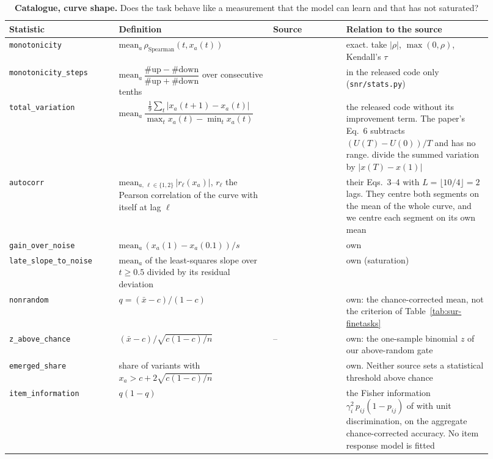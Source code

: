 \begin{table}[t]
\centering
\scriptsize
\begin{tabular}{@{}p{0.215\linewidth}p{0.28\linewidth}p{0.14\linewidth}p{0.285\linewidth}@{}}
\toprule
\textbf{Statistic} & \textbf{Definition} & \textbf{Source} & \textbf{Relation to the source} \\
\midrule
\texttt{monotonicity} & $\mathrm{mean}_a\,\rho_{\text{Spearman}}(t, x_a(t))$ & \citet{kydlicek_finetasks_nodate} & exact. \citet{hofmann_fluid_2025} take $|\rho|$, \citet{yagoubi_e2lm_2025} $\max(0, \rho)$, \citet{madaan_quantifying_2024} Kendall's $\tau$ \\
\texttt{monotonicity\_steps} & $\mathrm{mean}_a\,\dfrac{\#\text{up} - \#\text{down}}{\#\text{up} + \#\text{down}}$ over consecutive tenths & \citet{heineman_signal_2025} & in the released code only (\texttt{snr/stats.py}) \\
\texttt{total\_variation} & $\mathrm{mean}_a\,\dfrac{\frac{1}{9}\sum_{t}|x_a(t{+}1) - x_a(t)|}{\max_t x_a(t) - \min_t x_a(t)}$ & \citet{heineman_signal_2025, hofmann_fluid_2025} & the released code without its improvement term. The paper's Eq.~6 subtracts $(U(T) - U(0))/T$ and has no range. \citet{hofmann_fluid_2025} divide the summed variation by $|x(T) - x(1)|$ \\
\texttt{autocorr} & $\mathrm{mean}_{a,\,\ell \in \{1,2\}}\,|r_\ell(x_a)|$, $r_\ell$ the Pearson correlation of the curve with itself at lag $\ell$ & \citet{yagoubi_e2lm_2025} & their Eqs.~3--4 with $L = \lfloor 10/4 \rfloor = 2$ lags. They centre both segments on the mean of the whole curve, and we centre each segment on its own mean \\
\texttt{gain\_over\_noise} & $\mathrm{mean}_a\,(x_a(1) - x_a(0.1))/s$ & \citet{madaan_quantifying_2024} & own \\
\texttt{late\_slope\_to\_noise} & $\mathrm{mean}_a$ of the least-squares slope over $t \geq 0.5$ divided by its residual deviation & \citet{hofmann_fluid_2025} & own (saturation) \\
\texttt{nonrandom} & $q = (\bar{x} - c)/(1 - c)$ & \citet{kydlicek_finetasks_nodate} & own: the chance-corrected mean, not the criterion of Table~\ref{tab:sur-finetasks} \\
\texttt{z\_above\_chance} & $(\bar{x} - c)/\sqrt{c(1-c)/n}$ & -- & own: the one-sample binomial $z$ of our above-random gate \\
\texttt{emerged\_share} & share of variants with $x_a > c + 2\sqrt{c(1-c)/n}$ & \citet{du_understanding_2024, schaeffer_are_2023} & own. Neither source sets a statistical threshold above chance \\
\texttt{item\_information} & $q(1 - q)$ & \citet{rodriguez_evaluation_2021, vania_comparing_2021} & the Fisher information $\gamma_i^2\,p_{ij}(1 - p_{ij})$ of \citet{rodriguez_evaluation_2021} with unit discrimination, on the aggregate chance-corrected accuracy. No item response model is fitted \\
\bottomrule
\end{tabular}
\caption{\textbf{Catalogue, curve shape.} Does the task behave like a measurement that the model can learn and that has not saturated?}
\label{tab:sur-shape}
\end{table}

